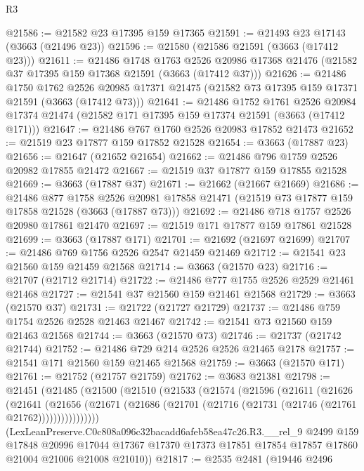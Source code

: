 \begin{lexlean}{R3}
\begin{coremodule}
@21586 := @21582 @23 @17395 @159 @17365
@21591 := @21493 @23 @17143 (@3663 (@21496 @23))
@21596 := @21580 (@21586 @21591 (@3663 (@17412 @23)))
@21611 := @21486
    @1748
    @1763
    @2526
    @20986
    @17368
    @21476
    (@21582 @37 @17395 @159 @17368 @21591 (@3663 (@17412 @37)))
@21626 := @21486
    @1750
    @1762
    @2526
    @20985
    @17371
    @21475
    (@21582 @73 @17395 @159 @17371 @21591 (@3663 (@17412 @73)))
@21641 := @21486
    @1752
    @1761
    @2526
    @20984
    @17374
    @21474
    (@21582 @171 @17395 @159 @17374 @21591 (@3663 (@17412 @171)))
@21647 := @21486 @767 @1760 @2526 @20983 @17852 @21473
@21652 := @21519 @23 @17877 @159 @17852 @21528
@21654 := @3663 (@17887 @23)
@21656 := @21647 (@21652 @21654)
@21662 := @21486 @796 @1759 @2526 @20982 @17855 @21472
@21667 := @21519 @37 @17877 @159 @17855 @21528
@21669 := @3663 (@17887 @37)
@21671 := @21662 (@21667 @21669)
@21686 := @21486
    @877
    @1758
    @2526
    @20981
    @17858
    @21471
    (@21519 @73 @17877 @159 @17858 @21528 (@3663 (@17887 @73)))
@21692 := @21486 @718 @1757 @2526 @20980 @17861 @21470
@21697 := @21519 @171 @17877 @159 @17861 @21528
@21699 := @3663 (@17887 @171)
@21701 := @21692 (@21697 @21699)
@21707 := @21486 @769 @1756 @2526 @2547 @21459 @21469
@21712 := @21541 @23 @21560 @159 @21459 @21568
@21714 := @3663 (@21570 @23)
@21716 := @21707 (@21712 @21714)
@21722 := @21486 @777 @1755 @2526 @2529 @21461 @21468
@21727 := @21541 @37 @21560 @159 @21461 @21568
@21729 := @3663 (@21570 @37)
@21731 := @21722 (@21727 @21729)
@21737 := @21486 @759 @1754 @2526 @2528 @21463 @21467
@21742 := @21541 @73 @21560 @159 @21463 @21568
@21744 := @3663 (@21570 @73)
@21746 := @21737 (@21742 @21744)
@21752 := @21486 @729 @214 @2526 @2526 @21465 @2178
@21757 := @21541 @171 @21560 @159 @21465 @21568
@21759 := @3663 (@21570 @171)
@21761 := @21752 (@21757 @21759)
@21762 := @3683 @21381
@21798 := @21451
    (@21485
      (@21500
        (@21510
          (@21533
            (@21574
              (@21596
                (@21611
                  (@21626
                    (@21641
                      (@21656
                        (@21671
                          (@21686 (@21701 (@21716 (@21731 (@21746 (@21761 @21762))))))))))))))))
      (LexLeanPreserve.C0c808a096c32bacadd6afeb58ea47c26.R3.__rel_9
        @2499
        @159
        @17848
        @20996
        @17044
        @17367
        @17370
        @17373
        @17851
        @17854
        @17857
        @17860
        @21004
        @21006
        @21008
        @21010))
@21817 := @2535
    @2481
    (@19446
      @2496

\end{coremodule}
\end{lexlean}
